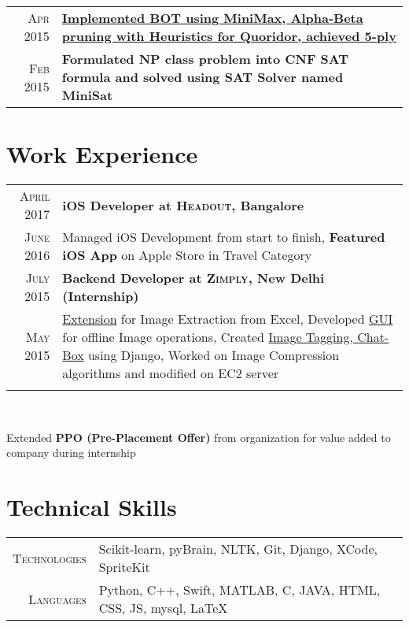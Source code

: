 \documentclass[a4paper,10pt]{article}
\begin{document}
\begin{tabular}{r|p{16cm}}
\textsc{Apr 2015} & \textbf{\href{https://github.com/kautsiitd/Games-and-BOTS}{Implemented BOT using MiniMax, Alpha-Beta pruning with Heuristics for Quoridor, achieved 5-ply}} \\

\textsc{Feb 2015} & \textbf{Formulated NP class problem into CNF SAT formula and solved using SAT Solver named MiniSat} \\

\end{tabular}

\section{Work Experience}
\begin{tabular}{r|p{16cm}}

\textsc{April 2017} & \textbf{iOS Developer at \textsc{Headout}, Bangalore} \\
\textsc{June 2016} & Managed iOS Development from start to finish, \textbf{Featured iOS App} on Apple Store in Travel Category\\

\textsc{July 2015} & \textbf{Backend Developer at \textsc{Zimply}, New Delhi (Internship)}\\
\textsc{May 2015} & \href{https://github.com/kautsiitd/Image-Extractor-for-Excel}{Extension} for Image Extraction from Excel, Developed \href{https://github.com/kautsiitd/Image-Optimizer}{GUI} for offline Image operations, Created \href{https://github.com/kautsiitd/Image-Tagging-and-Chat-Box}{Image Tagging, Chat-Box} using Django, Worked on Image Compression algorithms and modified on EC2 server\\
\multicolumn{2}{c}{}\\
\end{tabular}\\
\centerline{Extended \textbf{PPO (Pre-Placement Offer)} from organization for value added to company during internship}

\section{Technical Skills}
\begin{tabular}{r|p{15cm}}
\textsc{Technologies} & Scikit-learn, pyBrain, NLTK, Git,  Django, XCode, SpriteKit\\ 
\textsc{Languages} & Python, C++, Swift, MATLAB, C, JAVA, HTML, CSS, JS, mysql, LaTeX\\
\end{tabular}
\end{document}

